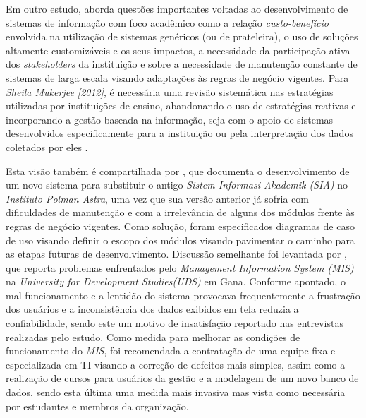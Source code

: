 \documentclass[nonacm, sigconf]{acmart}
\begin{document}
Em outro estudo, \cite{sis} aborda questões importantes voltadas ao desenvolvimento de sistemas de informação com foco acadêmico como a relação \textit{custo-benefício} envolvida na utilização de sistemas genéricos (ou de prateleira), o uso de soluções altamente customizáveis e os seus impactos, a necessidade da participação ativa dos \textit{stakeholders} da instituição e sobre a necessidade de manutenção constante de sistemas de larga escala visando adaptações às regras de negócio vigentes. Para \textit{Sheila Mukerjee [2012]}, é necessária uma revisão sistemática nas estratégias utilizadas por instituições de ensino, abandonando o uso de estratégias reativas e incorporando a gestão baseada na informação, seja com o apoio de sistemas desenvolvidos especificamente para a instituição ou pela interpretação dos dados coletados por eles \cite{murdick1984information}.

Esta visão também é compartilhada por \cite{sari2018}, que documenta o desenvolvimento de um novo sistema para substituir o antigo \textit{Sistem Informasi Akademik (SIA)} no \textit{Instituto Polman Astra}, uma vez que sua versão anterior já sofria com dificuldades de manutenção e com a irrelevância de alguns dos módulos frente às regras de negócio vigentes. Como solução, foram especificados diagramas de caso de uso visando definir o escopo dos módulos visando pavimentar o caminho para as etapas futuras de desenvolvimento. Discussão semelhante foi levantada por \cite{ampofo2020challenges}, que reporta problemas enfrentados pelo \textit{Management Information System (MIS)} na \textit{University for Development Studies(UDS)} em Gana. Conforme apontado, o mal funcionamento e a lentidão do sistema provocava frequentemente a frustração dos usuários e a inconsistência dos dados exibidos em tela reduzia a confiabilidade, sendo este um motivo de insatisfação reportado nas entrevistas realizadas pelo estudo. Como medida para melhorar as condições de funcionamento do \textit{MIS}, foi recomendada a contratação de uma equipe fixa e especializada em TI visando a correção de defeitos mais simples, assim como a realização de cursos para usuários da gestão e a modelagem de um novo banco de dados, sendo esta última uma medida mais invasiva mas vista como necessária por estudantes e membros da organização.
\end{document}
